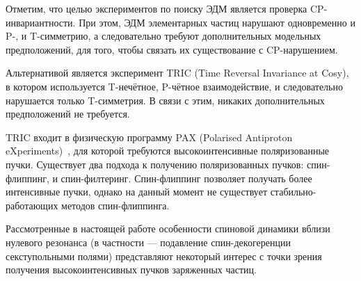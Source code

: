 
Отметим, что целью экспериментов по поиску ЭДМ является проверка CP-инвариантности. При этом, ЭДМ элементарных частиц нарушают одновременно и P-, и T-симметрию, а следовательно требуют дополнительных модельных предположений, для того, чтобы связать их существование с CP-нарушением.~\cite[стр.~1926]{Aksentev:TRIC}

Альтернативой является эксперимент TRIC (Time Reversal Invariance at Cosy),~\cite{Aksentev:TRIC} в котором используется T-нечётное, P-чётное взаимодействие, и следовательно нарушается только T-симметрия. В связи с этим, никаких дополнительных предположений не требуется.

TRIC входит в физическую программу PAX (Polarised Antiproton eXperiments)~\cite{Aksentev:PAX}, для которой требуются высокоинтенсивные поляризованные пучки. Существует два подхода к получению поляризованных пучков: спин-флиппинг, и спин-филтеринг. Спин-флиппинг позволяет получать более интенсивные пучки, однако на данный момент не существует стабильно-работающих методов спин-флиппинга.

Рассмотренные в настоящей работе особенности спиновой динамики вблизи нулевого резонанса (в частности --- подавление спин-декогеренции секступольными полями) представляют некоторый интерес с точки зрения получения высокоинтенсивных пучков заряженных частиц.